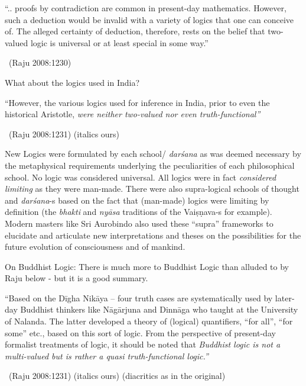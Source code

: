 \begin{myquote}
“.. proofs by contradiction are common in present-day mathematics. However, such a deduction would be invalid with a variety of logics that one can conceive of. The alleged certainty of deduction, therefore, rests on the belief that two-valued logic is universal or at least special in some way.” 

~\hfill (Raju 2008:1230)
\end{myquote}

What about the logics used in India?

\begin{myquote}
“However, the various logics used for inference in India, prior to even the historical Aristotle, \textit{were neither two-valued nor even\general{\break } truth-functional”} 

~\hfill (Raju 2008:1231) (italics ours)
\end{myquote}

New Logics were formulated by each school/ \textit{darśana} as was deemed necessary by the metaphysical requirements underlying the peculiarities of each philosophical school. No logic was considered universal. All logics were in fact \textit{considered limiting} as they were man-made. There were also supra-logical schools of thought and \textit{darśana}-s based on the fact that (man-made) logics were limiting by definition (the \textit{bhakti} and \textit{nyāsa} traditions of the Vaiṣṇava-s for example). Modern masters like Sri Aurobindo also used these “supra” frameworks to elucidate and articulate new interpretations and theses on the possibilities for the future evolution of consciousness and of mankind.

\newpage

On Buddhist Logic:  There is much more to Buddhist Logic than alluded to by Raju below - but it is a good summary.

\begin{myquote}
“Based on the Dīgha Nikāya – four truth cases are systematically used by later-day Buddhist thinkers like Nāgārjuna and Dinnāga who taught at the University of Nalanda. The latter developed a theory of (logical) quantifiers, “for all”, “for some” etc., based on this sort of logic. From the perspective of present-day formalist treatments of logic, it should be noted that \textit{Buddhist logic is not a multi-valued but is rather a quasi truth-functional logic.”}

~\hfill (Raju 2008:1231) (italics ours) (diacritics as in the original)
\end{myquote}

